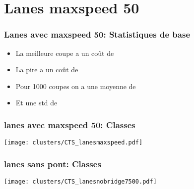 \documentclass[aspectratio=169]{beamer}
\begin{document}
    \section{Lanes maxspeed 50}
    \begin{frame}
        \frametitle{Lanes avec maxspeed 50: Statistiques de base}
    
        \begin{itemize}
            \item La meilleure coupe a un coût de 
            \item La pire a un coût de 
            \item Pour 1000 coupes on a une moyenne de 
            \item Et une std de 
        \end{itemize}
        
    \end{frame}
    \begin{frame}
        \frametitle{lanes avec maxspeed 50: Classes}
        \centering
        \texttt{[image: clusters/CTS\_lanesmaxspeed.pdf]}
    \end{frame}

    \begin{frame}
        \frametitle{lanes sans pont: Classes}
        \centering
        \texttt{[image: clusters/CTS\_lanesnobridge7500.pdf]}
    \end{frame}
\end{document}

